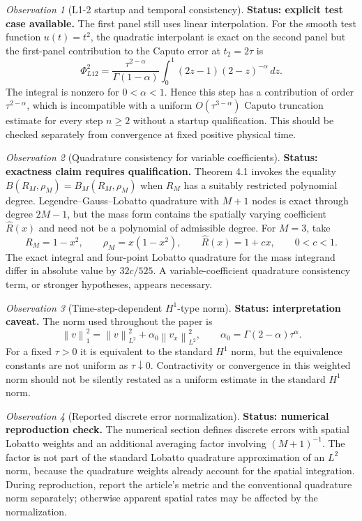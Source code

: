 \documentclass[11pt]{amsart}
\numberwithin{equation}{section}
\theoremstyle{remark}
\newtheorem{observation}{Observation}
\newcommand{\norm}[1]{\left\lVert #1\right\rVert}
\begin{document}
\begin{observation}[L1-2 startup and temporal consistency]
\textbf{Status: explicit test case available.}
The first panel still uses linear interpolation. For the smooth test function
$u(t)=t^2$, the quadratic interpolant is exact on the second panel but the
first-panel contribution to the Caputo error at $t_2=2\tau$ is
\[
\Phi_{L12}^{2}=\frac{\tau^{2-\alpha}}{\Gamma(1-\alpha)}
\int_0^1(2z-1)(2-z)^{-\alpha}\,dz.
\]
The integral is nonzero for $0<\alpha<1$. Hence this step has a contribution
of order $\tau^{2-\alpha}$, which is incompatible with a uniform
$O(\tau^{3-\alpha})$ Caputo truncation estimate for every step $n\geq2$
without a startup qualification. This should be checked separately from
convergence at fixed positive physical time.
\end{observation}

\begin{observation}[Quadrature consistency for variable coefficients]
\textbf{Status: exactness claim requires qualification.}
Theorem 4.1 invokes the equality $B(R_M,\rho_M)=B_M(R_M,\rho_M)$ when $R_M$
has a suitably restricted polynomial degree. Legendre--Gauss--Lobatto
quadrature with $M+1$ nodes is exact through degree $2M-1$, but the mass form
contains the spatially varying coefficient $\widehat R(x)$ and need not be a
polynomial of admissible degree. For $M=3$, take
\[
R_M=1-x^2,\qquad \rho_M=x(1-x^2),\qquad
\widehat R(x)=1+cx,\qquad 0<c<1.
\]
The exact integral and four-point Lobatto quadrature for the mass integrand
differ in absolute value by $32c/525$. A variable-coefficient quadrature
consistency term, or stronger hypotheses, appears necessary.
\end{observation}

\begin{observation}[Time-step-dependent $H^1$-type norm]
\textbf{Status: interpretation caveat.}
The norm used throughout the paper is
\[
\norm{v}_1^2=\norm{v}_{L^2}^2+\alpha_0\norm{v_x}_{L^2}^2,
\qquad \alpha_0=\Gamma(2-\alpha)\tau^\alpha.
\]
For a fixed $\tau>0$ it is equivalent to the standard $H^1$ norm, but the
equivalence constants are not uniform as $\tau\downarrow0$. Contractivity or
convergence in this weighted norm should not be silently restated as a
uniform estimate in the standard $H^1$ norm.
\end{observation}

\begin{observation}[Reported discrete error normalization]
\textbf{Status: numerical reproduction check.}
The numerical section defines discrete errors with spatial Lobatto weights
and an additional averaging factor involving $(M+1)^{-1}$. The factor is not
part of the standard Lobatto quadrature approximation of an $L^2$ norm,
because the quadrature weights already account for the spatial integration.
During reproduction, report the article's metric and the conventional
quadrature norm separately; otherwise apparent spatial rates may be affected
by the normalization.
\end{observation}
\end{document}
